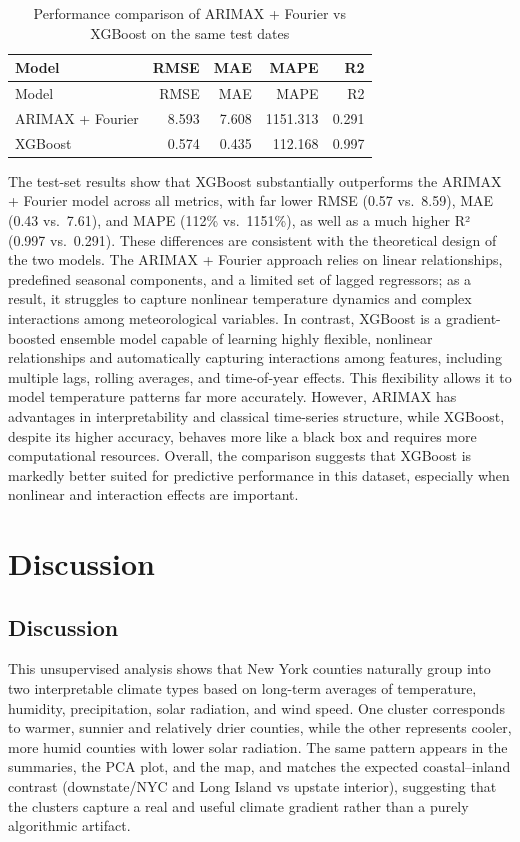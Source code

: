 \documentclass[
]{article}
\begin{document}
\begin{longtable}[]{@{}lrrrr@{}}
\caption{Performance comparison of ARIMAX + Fourier vs XGBoost on the
same test dates}\tabularnewline
\toprule\noalign{}
Model & RMSE & MAE & MAPE & R2 \\
\midrule\noalign{}
\endfirsthead
\toprule\noalign{}
Model & RMSE & MAE & MAPE & R2 \\
\midrule\noalign{}
\endhead
\bottomrule\noalign{}
\endlastfoot
ARIMAX + Fourier & 8.593 & 7.608 & 1151.313 & 0.291 \\
XGBoost & 0.574 & 0.435 & 112.168 & 0.997 \\
\end{longtable}

The test-set results show that XGBoost substantially outperforms the
ARIMAX + Fourier model across all metrics, with far lower RMSE (0.57
vs.~8.59), MAE (0.43 vs.~7.61), and MAPE (112\% vs.~1151\%), as well as
a much higher R² (0.997 vs.~0.291). These differences are consistent
with the theoretical design of the two models. The ARIMAX + Fourier
approach relies on linear relationships, predefined seasonal components,
and a limited set of lagged regressors; as a result, it struggles to
capture nonlinear temperature dynamics and complex interactions among
meteorological variables. In contrast, XGBoost is a gradient-boosted
ensemble model capable of learning highly flexible, nonlinear
relationships and automatically capturing interactions among features,
including multiple lags, rolling averages, and time-of-year effects.
This flexibility allows it to model temperature patterns far more
accurately. However, ARIMAX has advantages in interpretability and
classical time-series structure, while XGBoost, despite its higher
accuracy, behaves more like a black box and requires more computational
resources. Overall, the comparison suggests that XGBoost is markedly
better suited for predictive performance in this dataset, especially
when nonlinear and interaction effects are important.

\section{\texorpdfstring{\textbf{Discussion}}{Discussion}}\label{discussion}

\subsection{Discussion}\label{discussion-1}

This unsupervised analysis shows that New York counties naturally group
into two interpretable climate types based on long-term averages of
temperature, humidity, precipitation, solar radiation, and wind speed.
One cluster corresponds to warmer, sunnier and relatively drier
counties, while the other represents cooler, more humid counties with
lower solar radiation. The same pattern appears in the summaries, the
PCA plot, and the map, and matches the expected coastal--inland contrast
(downstate/NYC and Long Island vs upstate interior), suggesting that the
clusters capture a real and useful climate gradient rather than a purely
algorithmic artifact.
\end{document}
